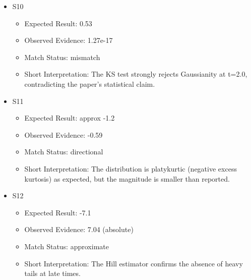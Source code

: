 \documentclass[11pt]{article}
\begin{document}
\begin{itemize}

\item S10

\begin{itemize}

\item Expected Result: 0.53

\item Observed Evidence: 1.27e-17

\item Match Status: mismatch

\item Short Interpretation: The KS test strongly rejects Gaussianity at t=2.0, contradicting the paper's statistical claim.

\end{itemize}

\item S11

\begin{itemize}

\item Expected Result: approx -1.2

\item Observed Evidence: -0.59

\item Match Status: directional

\item Short Interpretation: The distribution is platykurtic (negative excess kurtosis) as expected, but the magnitude is smaller than reported.

\end{itemize}

\item S12

\begin{itemize}

\item Expected Result: -7.1

\item Observed Evidence: 7.04 (absolute)

\item Match Status: approximate

\item Short Interpretation: The Hill estimator confirms the absence of heavy tails at late times.

\end{itemize}

\end{itemize}
\end{document}
